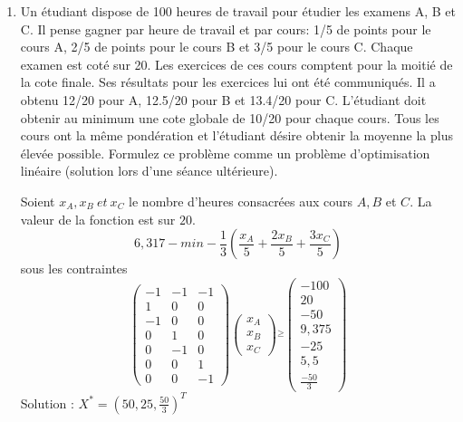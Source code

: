 \begin{enumerate}


  \item Un étudiant dispose de 100 heures de travail pour étudier les examens A, B et C. Il pense gagner par heure de travail et par
    cours: 1/5 de points pour le cours A, 2/5 de points pour le cours B et 3/5 pour le cours C. Chaque examen est coté sur 20. Les
    exercices de ces cours comptent pour la moitié de la cote finale. Ses résultats pour les exercices lui ont été communiqués. Il a
    obtenu 12/20 pour A, 12.5/20 pour B et 13.4/20 pour C.  L'étudiant doit obtenir au minimum une cote globale de 10/20 pour chaque cours. Tous
    les cours ont la même pondération et l'étudiant désire obtenir la  moyenne la plus élevée possible.  Formulez ce problème comme un problème d'optimisation
    linéaire (solution lors d'une séance ultérieure).
    \begin{solution}
      Soient $x_{A}, x_{B}~et~x_{C}$ le nombre d'heures consacrées aux cours $A, B$ et $C$. La valeur de la fonction est sur $20$.\\
      $$6,317 - min -\frac{1}{3}(\frac{x_{A}}{5} + \frac{2x_{B}}{5} + \frac{3x_{C}}{5})$$
      sous les contraintes \\
      \[
        \begin{pmatrix}
          -1 & -1 & -1\\
          1 & 0 & 0\\
          -1 & 0 & 0 \\
          0 & 1 & 0 \\
          0 & -1 & 0 \\
          0 & 0 & 1 \\
          0 & 0 & -1
        \end{pmatrix}
        \begin{pmatrix}
          x_{A}\\
          x_{B}\\
          x_{C}
        \end{pmatrix}
        \stackrel{\ge}{}
        \begin{pmatrix}
          -100\\
          20\\
          -50\\
          9,375\\
          -25\\
          5,5\\
          \frac{-50}{3}
        \end{pmatrix}
      \]
      \newline
      Solution : $X^{*} = (50,25,\frac{50}{3})^{T}$


\end{solution}
\end{enumerate}
